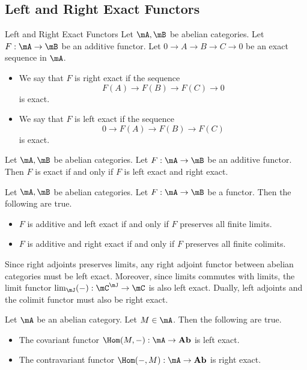 \documentclass[a4paper]{article}
\begin{document}
\subsection{Left and Right Exact Functors}
\begin{defn}{Left and Right Exact Functors}{} Let $\mA,\mB$ be abelian categories. Let $F:\mA\to\mB$ be an additive functor. Let $0\to A\to B\to C\to 0$ be an exact sequence in $\mA$. 
\begin{itemize}
\item We say that $F$ is right exact if the sequence $$F(A)\to F(B)\to F(C)\to 0$$ is exact. 
\item We say that $F$ is left exact if the sequence $$0\to F(A)\to F(B)\to F(C)$$ is exact. 
\end{itemize}
\end{defn}

\begin{lmm}{}{} Let $\mA,\mB$ be abelian categories. Let $F:\mA\to\mB$ be an additive functor. Then $F$ is exact if and only if $F$ is left exact and right exact. 
\end{lmm}

\begin{prp}{}{} Let $\mA,\mB$ be abelian categories. Let $F:\mA\to\mB$ be a functor. Then the following are true. 
\begin{itemize}
\item $F$ is additive and left exact if and only if $F$ preserves all finite limits. 
\item $F$ is additive and right exact if and only if $F$ preserves all finite colimits. 
\end{itemize}
\end{prp}

Since right adjoints preserves limits, any right adjoint functor between abelian categories must be left exact. Moreover, since limits commutes with limits, the limit functor $\lim_\mJ(-):\mC^\mJ\to\mC$ is also left exact. Dually, left adjoints and the colimit functor must also be right exact. 

\begin{prp}{}{} Let $\mA$ be an abelian category. Let $M\in\mA$. Then the following are true. 
\begin{itemize}
\item The covariant functor $\Hom(M,-):\mA\to\bold{Ab}$ is left exact. 
\item The contravariant functor $\Hom(-,M):\mA\to\bold{Ab}$ is right exact. 
\end{itemize}
\end{prp}
\end{document}
